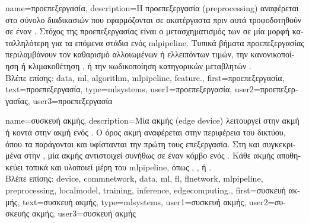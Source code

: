 {name={\foreignlanguage{greek}{προεπεξεργασία}},
	description={\foreignlanguage{greek}{Η προεπεξεργασία} (preprocessing) 
		\foreignlanguage{greek}{αναφέρεται στο σύνολο διαδικασιών που εφαρμόζονται σε ακατέργαστα}  
		\foreignlanguage{greek}{πριν αυτά τροφοδοτηθούν σε έναν}   \cite{hastie01statisticallearning}. 
		\foreignlanguage{greek}{Στόχος της προεπεξεργασίας είναι ο μετασχηματισμός των}  
		\foreignlanguage{greek}{σε μία μορφή καταλληλότερη για τα επόμενα στάδια ενός} \gls{mlpipeline}. 
		\foreignlanguage{greek}{Τυπικά βήματα προεπεξεργασίας περιλαμβάνουν τον καθαρισμό αλλοιωμένων ή ελλειπόντων τιμών, 
		την κανονικοποίηση ή κλιμακοθέτηση} , \foreignlanguage{greek}{ή την κωδικοποίηση κατηγορικών μεταβλητών}
		\cite{MLPipeline}. 
		\\
		\foreignlanguage{greek}{Βλέπε επίσης:} \gls{data}, \gls{ml}, \gls{algorithm}, \gls{mlpipeline}, \gls{feature}.},
	first={\foreignlanguage{greek}{προεπεξεργασία}},
	text={\foreignlanguage{greek}{προεπεξεργασία}},
	type=mlsystems,
	user1={\foreignlanguage{greek}{προεπεξεργασία}}, %
	user2={\foreignlanguage{greek}{προεπεξεργασίας}}, %
	user3={\foreignlanguage{greek}{προεπεξεργασία}} %
}

{name={\foreignlanguage{greek}{συσκευή ακμής}},
	description={\foreignlanguage{greek}{Μία}  \foreignlanguage{greek}{ακμής} 
		(edge device) \foreignlanguage{greek}{λειτουργεί στην ακμή ή κοντά στην ακμή ενός}  \cite{Shi2016}. 
		\foreignlanguage{greek}{Ο όρος ακμή αναφέρεται στην περιφέρεια του δικτύου, όπου τα}  
		\foreignlanguage{greek}{παράγονται και υφίστανται την πρώτη τους επεξεργασία. Στη}  \foreignlanguage{greek}{και συγκεκριμένα
		στην} , \foreignlanguage{greek}{μία}  \foreignlanguage{greek}{ακμής αντιστοιχεί συνήθως σε έναν κόμβο
		ενός} . \foreignlanguage{greek}{Κάθε}  \foreignlanguage{greek}{ακμής αποθηκεύει τοπικά}
		 \foreignlanguage{greek}{και υλοποιεί μέρη του} \gls{mlpipeline}, \foreignlanguage{greek}{όπως}
		 ,  , \foreignlanguage{greek}{ή}
		 \cite{Hashash2021}. 
		\\ 
		\foreignlanguage{greek}{Βλέπε επίσης:} \gls{device}, \gls{commnetwork}, \gls{data}, \gls{ml}, \gls{fl}, \gls{flnetwork}, \gls{mlpipeline}, \gls{preprocessing}, 
		\gls{localmodel}, \gls{training}, \gls{inference}, \gls{edgecomputing}.},
	first={\foreignlanguage{greek}{συσκευή ακμής}},
	text={\foreignlanguage{greek}{συσκευή ακμής}},
	type=mlsystems,
	user1={\foreignlanguage{greek}{συσκευή ακμής}}, %
	user2={\foreignlanguage{greek}{συσκευής ακμής}}, %
	user3={\foreignlanguage{greek}{συσκευή ακμής}} %
}

